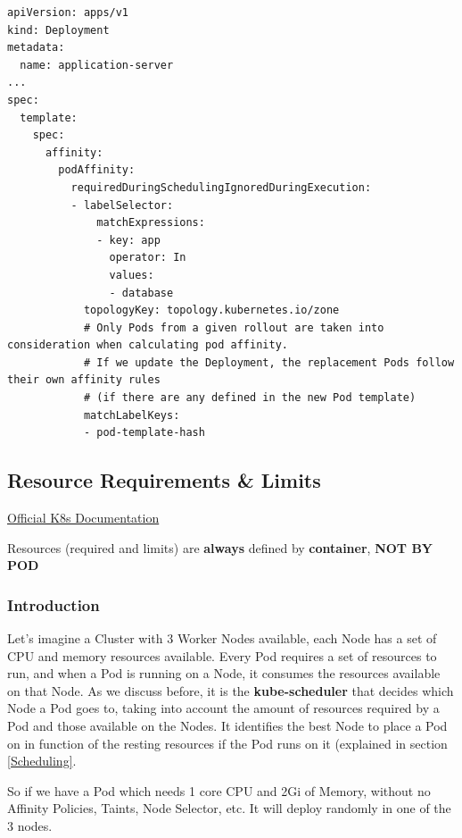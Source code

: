 \documentclass{article}
\newenvironment{blocktemplateIII}[1]{%
    \tcolorbox[beamer,%
    noparskip,breakable,
    ,colframe=Red,%
    colbacklower=LimeGreen!75!LightGreen,%
    title=#1]}%
    {\endtcolorbox}
\newenvironment{codetemplate}[1][]{%
  \mybasecolorbox[#1]
  \itshape
}{%
  \endmybasecolorbox
}
\begin{document}
\begin{codetemplate}{}
\begin{verbatim}
apiVersion: apps/v1
kind: Deployment
metadata:
  name: application-server
...
spec:
  template:
    spec:
      affinity:
        podAffinity:
          requiredDuringSchedulingIgnoredDuringExecution:
          - labelSelector:
              matchExpressions:
              - key: app
                operator: In
                values:
                - database
            topologyKey: topology.kubernetes.io/zone
            # Only Pods from a given rollout are taken into consideration when calculating pod affinity.
            # If we update the Deployment, the replacement Pods follow their own affinity rules
            # (if there are any defined in the new Pod template)
            matchLabelKeys:
            - pod-template-hash
\end{verbatim}
\end{codetemplate}

\subsection{Resource Requirements \& Limits}

\href{https://kubernetes.io/docs/concepts/configuration/manage-resources-containers/}{Official K8s Documentation}

\begin{blocktemplateIII}{WARNING}
Resources (required and limits) are \textbf{always} defined by \textbf{container}, \textbf{NOT BY POD}
\end{blocktemplateIII}

\subsubsection{Introduction}
Let's imagine a Cluster with 3 Worker Nodes available, each Node has a set of CPU and memory resources available. Every Pod requires a set of resources to run, and when a Pod is running on a Node, it consumes the resources available on that Node. As we discuss before, it is the \textbf{kube-scheduler} that decides which Node a Pod goes to, taking into account the amount of resources required by a Pod and those available on the Nodes. It identifies the best Node to place a Pod on in function of the resting resources if the Pod runs on it (explained in section \ref{Scheduling}.

So if we have a Pod which needs 1 core CPU and 2Gi of Memory, without no Affinity Policies, Taints, Node Selector, etc. It will deploy randomly in one of the 3 nodes. 
\end{document}
